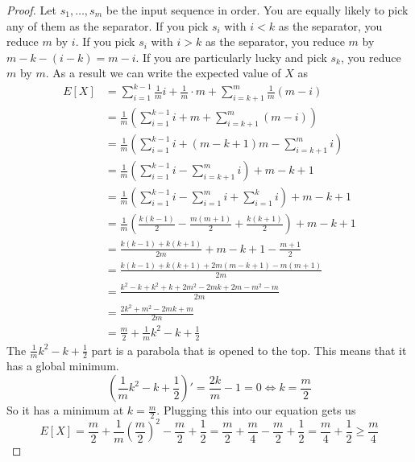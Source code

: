 \documentclass[10pt,a4paper]{article}
\begin{document}
\begin{proof}
  Let $s_{1}, \dots, s_{m}$ be the input sequence in order.
  You are equally likely to pick any of them as the separator.
  If you pick $s_{i}$ with $i < k$ as the separator, you reduce $m$ by $i$.
  If you pick $s_{i}$ with $i > k$ as the separator, you reduce $m$ by $m - k - (i - k) = m - i$.
  If you are particularly lucky and pick $s_{k}$, you reduce $m$ by $m$.
  As a result we can write the expected value of $X$ as
  \begin{align*}
    E[X] & = \sum_{i = 1}^{k - 1} \frac{1}{m} i + \frac{1}{m} \cdot m + \sum_{i = k + 1}^{m} \frac{1}{m} (m - i)\\
         & = \frac{1}{m} \left( \sum_{i = 1}^{k - 1} i + m + \sum_{i = k + 1}^{m} (m - i) \right)\\
         & = \frac{1}{m} \left( \sum_{i = 1}^{k - 1} i + (m - k + 1)m - \sum_{i = k + 1}^{m} i \right)\\
         & = \frac{1}{m} \left( \sum_{i = 1}^{k - 1} i - \sum_{i = k + 1}^{m} i \right) + m - k + 1\\
         & = \frac{1}{m} \left( \sum_{i = 1}^{k - 1} i - \sum_{i = 1}^{m} i + \sum_{i = 1}^{k} i \right) + m - k + 1\\
         & = \frac{1}{m} \left( \frac{k(k - 1)}{2} - \frac{m(m + 1)}{2} + \frac{k(k + 1)}{2} \right) + m - k + 1\\
         & = \frac{k(k - 1) + k(k + 1)}{2m} + m - k + 1 - \frac{m + 1}{2}\\
         & = \frac{k(k - 1) + k(k + 1) + 2m(m - k + 1) - m(m + 1)}{2m}\\
         & = \frac{k^{2} - k + k^{2} + k + 2m^{2} - 2mk + 2m - m^{2} - m}{2m}\\
         & = \frac{2k^{2} + m^{2} - 2mk + m}{2m}\\
         & = \frac{m}{2} + \frac{1}{m}k^{2} - k + \frac{1}{2}
  \end{align*}
  The $\frac{1}{m}k^{2} - k + \frac{1}{2}$ part is a parabola that is opened to the top.
  This means that it has a global minimum.
  \begin{equation*}
    \left( \frac{1}{m}k^{2} - k + \frac{1}{2} \right)' = \frac{2k}{m} - 1 = 0 \Leftrightarrow k = \frac{m}{2}
  \end{equation*}
  So it has a minimum at $k = \frac{m}{2}$.
  Plugging this into our equation gets us
  \begin{equation*}
    E[X] = \frac{m}{2} + \frac{1}{m}\left( \frac{m}{2} \right)^{2} - \frac{m}{2} + \frac{1}{2} = \frac{m}{2} + \frac{m}{4} - \frac{m}{2} + \frac{1}{2} = \frac{m}{4} + \frac{1}{2} \ge \frac{m}{4}
  \end{equation*}
\end{proof}
\end{document}
